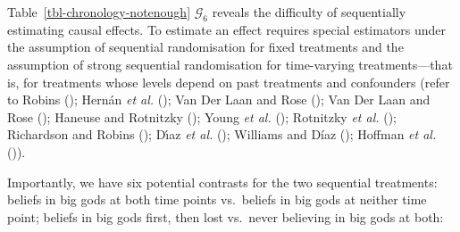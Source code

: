 \documentclass[
  single column]{article}
\begin{document}
Table~\ref{tbl-chronology-notenough} \(\mathcal{G}_6\) reveals the
difficulty of sequentially estimating causal effects. To estimate an
effect requires special estimators under the assumption of sequential
randomisation for fixed treatments and the assumption of strong
sequential randomisation for time-varying treatments---that is, for
treatments whose levels depend on past treatments and confounders (refer
to Robins (); Hernán \emph{et al.}
(); Van Der Laan and Rose
(); Van Der Laan and Rose
(); Haneuse and Rotnitzky
(); Young \emph{et al.}
(); Rotnitzky \emph{et al.}
(); Richardson and Robins
(); Dı́az \emph{et al.}
(); Williams and Díaz
(); Hoffman \emph{et al.}
()).

Importantly, we have six potential contrasts for the two sequential
treatments: beliefs in big gods at both time points vs.~beliefs in big
gods at neither time point; beliefs in big gods first, then lost
vs.~never believing in big gods at both:
\end{document}
